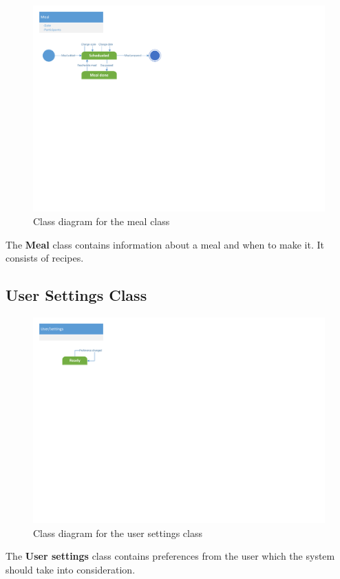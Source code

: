 \begin{figure}[H]
	\centering
	\includegraphics[clip=true, trim=0.5cm 13cm 16.5cm 0.5cm]{Development/ProblemDomain/MealClass.pdf}
	\caption{Class diagram for the meal class} \label{MealClass}
\end{figure}
The \textbf{Meal} class contains information about a meal and when to make it. It consists of recipes.

\subsection{User Settings Class}


\begin{figure}[H]
	\centering
	\includegraphics[clip=true, trim=0.5cm 15.5cm 22.5cm 0.5cm]{Development/ProblemDomain/UserSettingsClass.pdf}
	\caption{Class diagram for the user settings class} \label{UserSettingsClass}
\end{figure}
The \textbf{User settings} class contains preferences from the user which the system should take into consideration.

